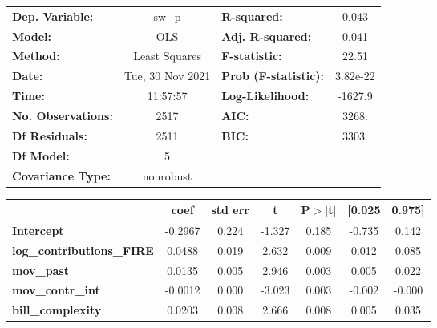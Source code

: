 \begin{center}
\begin{tabular}{lclc}
\toprule
\textbf{Dep. Variable:}           &      sw\_p       & \textbf{  R-squared:         } &     0.043   \\
\textbf{Model:}                   &       OLS        & \textbf{  Adj. R-squared:    } &     0.041   \\
\textbf{Method:}                  &  Least Squares   & \textbf{  F-statistic:       } &     22.51   \\
\textbf{Date:}                    & Tue, 30 Nov 2021 & \textbf{  Prob (F-statistic):} &  3.82e-22   \\
\textbf{Time:}                    &     11:57:57     & \textbf{  Log-Likelihood:    } &   -1627.9   \\
\textbf{No. Observations:}        &        2517      & \textbf{  AIC:               } &     3268.   \\
\textbf{Df Residuals:}            &        2511      & \textbf{  BIC:               } &     3303.   \\
\textbf{Df Model:}                &           5      & \textbf{                     } &             \\
\textbf{Covariance Type:}         &    nonrobust     & \textbf{                     } &             \\
\bottomrule
\end{tabular}
\begin{tabular}{lcccccc}
                                  & \textbf{coef} & \textbf{std err} & \textbf{t} & \textbf{P$> |$t$|$} & \textbf{[0.025} & \textbf{0.975]}  \\
\midrule
\textbf{Intercept}                &      -0.2967  &        0.224     &    -1.327  &         0.185        &       -0.735    &        0.142     \\
\textbf{log\_contributions\_FIRE} &       0.0488  &        0.019     &     2.632  &         0.009        &        0.012    &        0.085     \\
\textbf{mov\_past}                &       0.0135  &        0.005     &     2.946  &         0.003        &        0.005    &        0.022     \\
\textbf{mov\_contr\_int}          &      -0.0012  &        0.000     &    -3.023  &         0.003        &       -0.002    &       -0.000     \\
\textbf{bill\_complexity}         &       0.0203  &        0.008     &     2.666  &         0.008        &        0.005    &        0.035     \\

\end{tabular}
\end{center}
